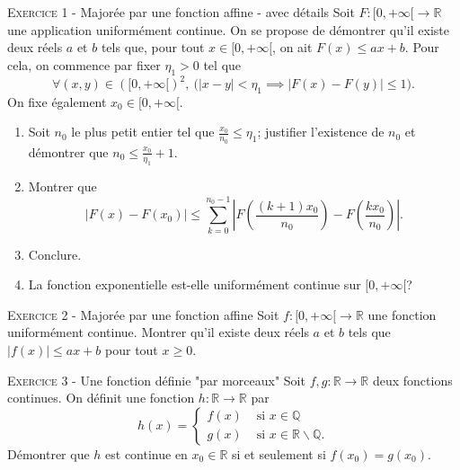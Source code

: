 \documentclass[11pt]{article}
\begin{document}
 




\vskip0.3cm\noindent\textsc{Exercice 1} - Majorée par une fonction affine - avec détails
\vskip0.2cm
Soit $F:[0,+\infty[\to\mathbb R$ une application uniformément continue. On se propose de démontrer qu'il existe
deux réels $a$ et $b$ tels que, pour tout $x\in[0,+\infty[$, on ait $F(x)\leq ax+b$. Pour cela, on commence par fixer $\eta_1>0$
tel que 
$$\forall (x,y)\in([0,+\infty[)^2,\ \big(|x-y|<\eta_1\implies |F(x)-F(y)|\leq 1\big).$$
On fixe également $x_0\in[0,+\infty[$.
\begin{enumerate}
\item Soit $n_0$ le plus petit entier tel que $\frac{x_0}{n_0}\leq \eta_1$; justifier l'existence de $n_0$ et démontrer que $n_0\leq \frac{x_0}{\eta_1}+1$.
\item Montrer que 
$$|F(x)-F(x_0)|\leq \sum_{k=0}^{n_0-1}\left|F\left(\frac{(k+1)x_0}{n_0}\right)-F\left(\frac{kx_0}{n_0}\right)\right|.$$
\item Conclure.
\item La fonction exponentielle est-elle uniformément continue sur $[0,+\infty[$?
\end{enumerate}




\vskip0.3cm\noindent\textsc{Exercice 2} - Majorée par une fonction affine
\vskip0.2cm
Soit $f:[0,+\infty[\to\mathbb R$ une fonction uniformément continue.
Montrer qu'il existe deux réels $a$ et $b$ tels que
$|f(x)|\leq ax+b$ pour tout $x\geq 0$.




\vskip0.3cm\noindent\textsc{Exercice 3} - Une fonction définie "par morceaux"
\vskip0.2cm
Soit $f,g:\mathbb R\to\mathbb R$ deux fonctions continues. On définit une fonction $h:\mathbb R\to\mathbb R$ par 
$$h(x)=\left\{
\begin{array}{ll}
f(x)&\textrm{ si }x\in\mathbb Q\\
g(x)&\textrm{ si }x\in\mathbb R\backslash \mathbb Q.
\end{array}\right.$$
Démontrer que $h$ est continue en $x_0\in\mathbb R$ si et seulement si $f(x_0)=g(x_0)$.




\vskip0.5cm

\end{document}
